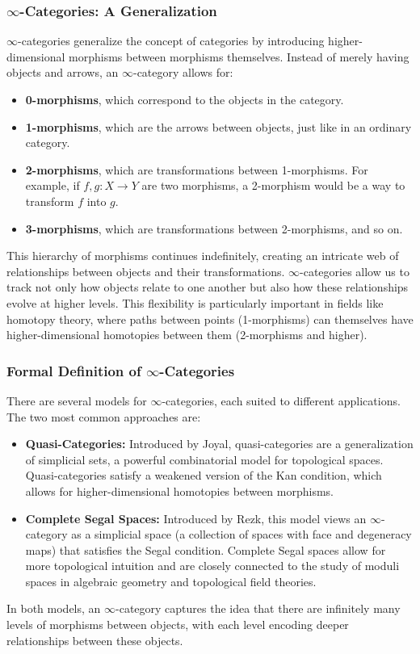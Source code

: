 \documentclass{article}
\theoremstyle{remark}
\begin{document}
\subsubsection{$\infty$-Categories: A Generalization}

$\infty$-categories generalize the concept of categories by introducing higher-dimensional morphisms between morphisms themselves. Instead of merely having objects and arrows, an $\infty$-category allows for:
\begin{itemize}
    \item \textbf{0-morphisms}, which correspond to the objects in the category.
    \item \textbf{1-morphisms}, which are the arrows between objects, just like in an ordinary category.
    \item \textbf{2-morphisms}, which are transformations between 1-morphisms. For example, if $f, g: X \to Y$ are two morphisms, a 2-morphism would be a way to transform $f$ into $g$.
    \item \textbf{3-morphisms}, which are transformations between 2-morphisms, and so on.
\end{itemize}

This hierarchy of morphisms continues indefinitely, creating an intricate web of relationships between objects and their transformations. $\infty$-categories allow us to track not only how objects relate to one another but also how these relationships evolve at higher levels. This flexibility is particularly important in fields like homotopy theory, where paths between points (1-morphisms) can themselves have higher-dimensional homotopies between them (2-morphisms and higher).

\subsubsection{Formal Definition of $\infty$-Categories}

There are several models for $\infty$-categories, each suited to different applications. The two most common approaches are:
\begin{itemize}
    \item \textbf{Quasi-Categories:} Introduced by Joyal, quasi-categories are a generalization of simplicial sets, a powerful combinatorial model for topological spaces. Quasi-categories satisfy a weakened version of the Kan condition, which allows for higher-dimensional homotopies between morphisms.
    
    \item \textbf{Complete Segal Spaces:} Introduced by Rezk, this model views an $\infty$-category as a simplicial space (a collection of spaces with face and degeneracy maps) that satisfies the Segal condition. Complete Segal spaces allow for more topological intuition and are closely connected to the study of moduli spaces in algebraic geometry and topological field theories.
\end{itemize}
In both models, an $\infty$-category captures the idea that there are infinitely many levels of morphisms between objects, with each level encoding deeper relationships between these objects.
\end{document}

